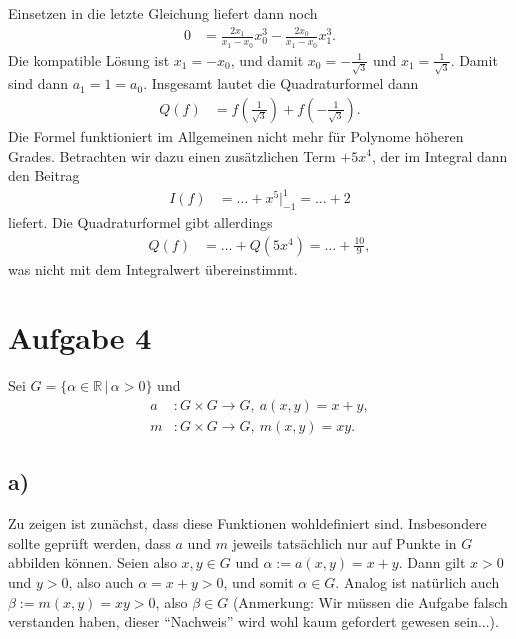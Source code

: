 \documentclass[english, parskip=full]{scrartcl}
\newcommand{\kla}{}
\begin{document}
Einsetzen in die letzte Gleichung liefert dann noch
\begin{align}
0 &= \frac{2x_1}{x_1 - x_0}x_0^3 - \frac{2x_0}{x_1 - x_0}x_1^3.
\end{align}
Die kompatible Lösung ist $x_1 = -x_0$, und damit $x_0 = -\frac{1}{\sqrt{3}}$ und $x_1 = \frac{1}{\sqrt{3}}$.
Damit sind dann $a_1 = 1 = a_0$.
Insgesamt lautet die Quadraturformel dann
\begin{align}
Q(f) &= f\kla\left( \frac{1}{\sqrt{3}} \right) + f\kla\left( -\frac{1}{\sqrt{3}} \right).
\end{align}
Die Formel funktioniert im Allgemeinen nicht mehr für Polynome höheren Grades.
Betrachten wir dazu einen zusätzlichen Term $+5x^4$, der im Integral dann den Beitrag
\begin{align}
I(f) &= \dots + x^5\Big\vert_{-1}^1 = \dots + 2
\end{align}
liefert.
Die Quadraturformel gibt allerdings
\begin{align}
Q(f) &= \dots + Q(5x^4) = \dots + \frac{10}{9},
\end{align}
was nicht mit dem Integralwert übereinstimmt.

\newpage
\section*{Aufgabe 4}
Sei $G = \{\alpha\in\mathbb{R}\, |\, \alpha > 0\}$ und 
\begin{align}
a &: G\times G \rightarrow G,\ a(x,y) = x+y,\\
m &: G\times G \rightarrow G,\ m(x,y) = xy.
\end{align}
\subsection*{a)}
Zu zeigen ist zunächst, dass diese Funktionen wohldefiniert sind. 
Insbesondere sollte geprüft werden, dass $a$ und $m$ jeweils tatsächlich nur auf Punkte in $G$ abbilden können.
Seien also $x,y\in G$ und $\alpha := a(x,y) = x + y$.
Dann gilt $x> 0$ und $y>0$, also auch $\alpha = x+y > 0$, und somit $\alpha\in G$.
Analog ist natürlich auch $\beta := m(x,y) = xy > 0$, also $\beta\in G$ (Anmerkung: Wir müssen die Aufgabe falsch verstanden haben, dieser ``Nachweis'' wird wohl kaum gefordert gewesen sein...).
\end{document}

